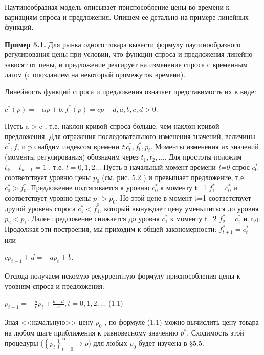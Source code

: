 \documentclass[12pt, 4paper]{book}
\begin{document}
{Паутинообразная модель описывает приспособление цены во времени к вариациям спроса и предложения. Опишем ее детально на примере линейных функций.
\par

\textbf{Пример 5.1.} Для рынка одного товара вывести формулу паутинообразного регулирования цены при условии, что функции спроса и предложения линейно зависят от цены, и предложение реагирует на изменение спроса с временным лагом (с опозданием на некоторый промежуток времени).
\par

Линейность функций спроса и предложения означает представимость их в виде:
\begin{center}
$c^{*}(p)= -\alpha p +b,f^{*}(p) = cp+d,a,b,c,d > 0 $.
\end{center}
Пусть a > c , т.е. наклон кривой спроса больше, чем наклон кривой предложения. Для отражения последовательного изменения значений, величины $c^{*},f$, и p снабдим индексом времени \textit{t}:$c_{t}^{*},f_{t}^{*},p_t$. Моменты изменения их значений (моменты регулирования) обозначим через $t_1,t_2,...$. Для простоты положим $t_k - t_{k-1} = 1$ , т.е. $t = 0,1,2...$  Пусть в начальный момент времени \textit{t=0} спрос $c_{0}^{*}$ соответствует уровню цены $p_0$ (см. рис. 5.2 ) и превышает предложение, т.е. $c_{0}^{*} > f_{0}^{*}$. Предложение подтягивается к уровню $c_{0}^{*}$ к моменту t=1 $f_{1}^{*} = c_{0}^{*}$ и соответствует уровню цены $p_1 > p_0$. Но этой цене в момент t=1 соответствует другой уровень спроса $c_{1}^{*} < f_{1}^{*}$, который вынуждает цену уменьшиться до уровня $p_2 < p_1$. Далее предложение снижается до уровня $c_{1}^{*}$ к моменту t=2 $f_{2}^{*} = c_{1}^{*}$ и т.д. Продолжая эти построения, мы приходим к общей закономерности: $f_{t+1}^{*} = c_{t}^{*}$ или
\begin{center}
$c p_{t+1} + d = -a p_{t} + b.$
\end{center}
\par

Отсюда получаем искомую рекуррентную формулу приспособления цены к уровням спроса и предложения:
\par

\begin{center}
$p_{t+1} = - \frac{a}{c}p_{t} + \frac{b-d}{c}, t=0,1,2,...$ (1.1)
\end{center}
\par

Зная <<начальную>> цену $p_0$ , по формуле  (1.1) можно вычислить цену товара на любом шаге приближения к равновесному значению $p^{*}$. Сходимость этой процедуры ($\left\{p_t \right\}_{t=0}^{\infty} \rightarrow p$) для любых $p_0$ будет изучена в §5.5. 
\par

}
\end{document}
